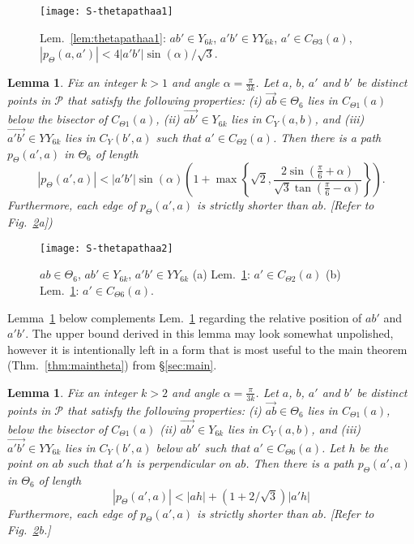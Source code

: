 \documentclass[11pt]{article}
\newcommand\cone{{C}}
\newcommand\Pt{\mathcal P}
\newcommand{\arr}[1]{\overrightarrow{#1}}
\newtheorem{lemma}[theorem]{Lemma}
\begin{document}
\begin{figure}[htpb]
\centering
\texttt{[image: S-thetapathaa1]}
\caption{Lem.~\ref{lem:thetapathaa1}: $ab' \in Y_{6k}$, $a'b' \in YY_{6k}$, $a' \in \cone_{\Theta3}(a)$, $|p_\Theta(a,a')| <  4|a'b'|\sin(\alpha)/\sqrt{3}$.}
\label{fig:thetapathaa1}
\end{figure}


\vspace{-1em}
\begin{lemma}
Fix an integer $k > 1$ and angle $\alpha = \frac{\pi}{3k}$. Let $a$, $b$, $a'$ and $b'$ be distinct points in $\Pt$ that satisfy the following properties: (i) $\arr{ab} \in \Theta_6$ lies in $\cone_{\Theta1}(a)$ below the bisector of $\cone_{\Theta1}(a)$, (ii) $\arr{ab'} \in Y_{6k}$ lies in $\cone_Y(a, b)$, and (iii) $\arr{a'b'} \in YY_{6k}$ lies in $\cone_Y(b', a)$ such that $a' \in \cone_{\Theta2}(a)$. Then there is a path $p_\Theta(a', a)$ in $\Theta_6$ of length
\[
|p_\Theta(a',a)| < |a'b'|\sin(\alpha)\left( 1 +
\max\left\{\sqrt{2}, \frac{2\sin(\frac{\pi}{6}+\alpha)}{\sqrt{3}\tan(\frac{\pi}{6}-\alpha)}\right\}\right).\]
\noindent
Furthermore, each edge of $p_\Theta(a',a)$ is strictly shorter than $ab$.
\emph{[Refer to Fig.~\ref{fig:S-thetapathaa2}a])}
\label{lem:thetapathaa2}
\end{lemma}

\begin{figure}[htpb]
\centering
\texttt{[image: S-thetapathaa2]}
\caption{$ab \in \Theta_6$, $ab' \in Y_{6k}$, $a'b' \in YY_{6k}$ (a) Lem.~\ref{lem:thetapathaa2}: $a' \in \cone_{\Theta2}(a)$ (b) Lem.~\ref{lem:thetapathaa3}: $a' \in \cone_{\Theta6}(a)$.}
\label{fig:S-thetapathaa2}
\end{figure}


\noindent
Lemma~\ref{lem:thetapathaa3} below complements Lem.~\ref{lem:thetapathaa2} regarding the relative position of $ab'$ and $a'b'$. The upper bound derived in this lemma may look somewhat unpolished, however it is intentionally left in a form that is most useful to the main theorem (Thm.~\ref{thm:maintheta}) from \S\ref{sec:main}.
\begin{lemma}
Fix an integer $k > 2$ and angle $\alpha = \frac{\pi}{3k}$. Let $a$, $b$, $a'$ and $b'$ be distinct points in $\Pt$ that satisfy the following properties: (i) $\arr{ab} \in \Theta_6$ lies in $\cone_{\Theta1}(a)$, below the bisector of $\cone_{\Theta1}(a)$ (ii) $\arr{ab'} \in Y_{6k}$ lies in $\cone_Y(a, b)$,
and (iii) $\arr{a'b'} \in YY_{6k}$ lies in $\cone_Y(b', a)$ below $ab'$ such that $a' \in \cone_{\Theta6}(a)$.
Let $h$ be the point on $ab$ such that $a'h$ is perpendicular on $ab$. Then there is a path $p_\Theta(a', a)$ in $\Theta_6$ of length
\[
|p_\Theta(a',a)| < |ah| + (1+2/\sqrt{3})|a'h|
\]
Furthermore, each edge of $p_\Theta(a',a)$ is strictly shorter than $ab$.
\emph{[Refer to Fig.~\ref{fig:S-thetapathaa2}b.]}
\label{lem:thetapathaa3}
\end{lemma}
\end{document}
